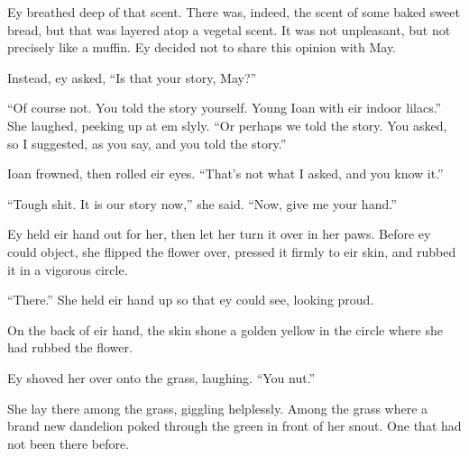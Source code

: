 Ey breathed deep of that scent. There was, indeed, the scent of some baked sweet bread, but that was layered atop a vegetal scent. It was not unpleasant, but not precisely like a muffin. Ey decided not to share this opinion with May.

Instead, ey asked, ``Is that your story, May?''

``Of course not. You told the story yourself. Young Ioan with eir indoor lilacs.'' She laughed, peeking up at em slyly. ``Or perhaps we told the story. You asked, so I suggested, as you say, and you told the story.''

Ioan frowned, then rolled eir eyes. ``That's not what I asked, and you know it.''

``Tough shit. It is our story now,'' she said. ``Now, give me your hand.''

Ey held eir hand out for her, then let her turn it over in her paws. Before ey could object, she flipped the flower over, pressed it firmly to eir skin, and rubbed it in a vigorous circle.

``There.'' She held eir hand up so that ey could see, looking proud.

On the back of eir hand, the skin shone a golden yellow in the circle where she had rubbed the flower.

Ey shoved her over onto the grass, laughing. ``You nut.''

She lay there among the grass, giggling helplessly. Among the grass where a brand new dandelion poked through the green in front of her snout. One that had not been there before.

